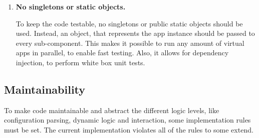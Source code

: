 \begin{enumerate}
	\item \textbf{No singletons or static objects.}
	
	To keep the code testable, no singletons or public static objects should be used.
	Instead, an object, that represents the app instance should be passed to every sub-component.
	This makes it possible to run any amount of virtual apps in parallel, to enable fast testing.
	Also, it allows for dependency injection, to perform white box unit tests.
	
	
	
\end{enumerate}

\subsection{Maintainability}

To make code maintainable and abstract the different logic levels, like configuration parsing, dynamic logic and interaction, some implementation rules must be set.
The current implementation violates all of the rules to some extend.

